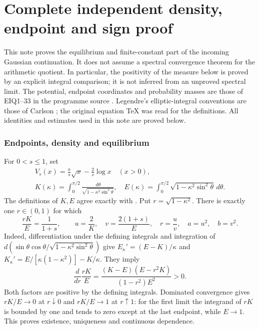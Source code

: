 \documentclass[11pt]{article}
\begin{document}
\endgroup

\clearpage\begingroup
\part*{Complete independent density, endpoint and sign proof}
\newtheorem{garmomenttheorem}{Theorem}\newtheorem{garmomentlemma}[garmomenttheorem]{Lemma}
\newcommand{\garmomentdd}{\,d}\newcommand{\garmomentR}{\mathbb R}

This note proves the equilibrium and finite-constant part of the incoming
Gaussian continuation. It does not assume a spectral convergence theorem
for the arithmetic quotient. In particular, the positivity of the measure
below is proved by an explicit integral comparison; it is not inferred
from an unproved spectral limit. The potential, endpoint coordinates and
probability masses are those of EIQ1--33 in the programme source
\cite{garmoment:EIQ}. Legendre's elliptic-integral conventions are those of Carlson
\cite{garmoment:Carlson}; the original equation TeX was read for the definitions.
All identities and estimates used in this note are proved below.

\section{Endpoints, density and equilibrium}
For $0<s\le1$, set
\begin{equation}\tag{GM1}
 \begin{gathered}
 V_s(x)=\frac\pi s\sqrt x-\frac2s\log x\quad(x>0),\qquad
 \\
 K(\kappa)=\int_0^{\pi/2}\frac{\garmomentdd\theta}{\sqrt{1-\kappa^2\sin^2\theta}},
 \quad E(\kappa)=\int_0^{\pi/2}\sqrt{1-\kappa^2\sin^2\theta}\garmomentdd\theta.
 \end{gathered}
\end{equation}
The definitions of $K,E$ agree exactly with \cite[19.2.4, 19.2.5,
19.2.8(a,b)]{garmoment:Carlson}. Put $r=\sqrt{1-\kappa^2}$. There is exactly one
$r\in(0,1)$ for which
\begin{equation}\tag{GM2}
 \frac{rK}{E}=\frac1{1+s},\qquad
 u=\frac2K,\quad v=\frac{2(1+s)}E,\quad r=\frac uv,
 \quad a=u^2,\quad b=v^2.
\end{equation}
Indeed, differentiation under the defining integrals and integration of
$d(\sin\theta\cos\theta/\sqrt{1-\kappa^2\sin^2\theta})$ give
$E_\kappa'=(E-K)/\kappa$ and
$K_\kappa'=E/[\kappa(1-\kappa^2)]-K/\kappa$.
They imply
\begin{equation}\tag{GM3}
 \frac{d}{dr}\frac{rK}E
 =\frac{(K-E)(E-r^2K)}{(1-r^2)E^2}>0.
\end{equation}
Both factors are positive by the defining integrals. Dominated convergence
gives $rK/E\to0$ at $r\downarrow0$ and $rK/E\to1$ at $r\uparrow1$:
for the first limit the integrand of $rK$ is bounded by one and tends
to zero except at the last endpoint, while $E\to1$.
This proves existence, uniqueness and continuous dependence.
\end{document}
